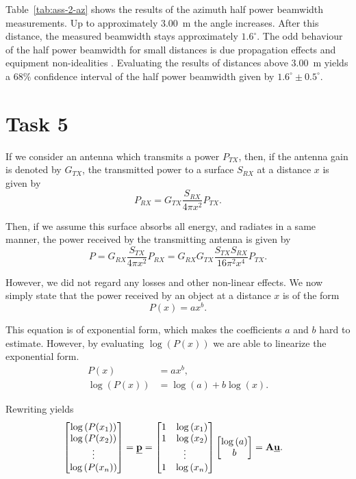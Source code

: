 \documentclass[11pt,titlepage]{report}
\begin{document}
Table~\ref{tab:ass-2-az} shows the results of the azimuth half power beamwidth measurements. Up to approximately \SI{3.00}{m} the angle increases. After this distance, the measured beamwidth stays approximately $1.6^\circ$. The odd behaviour of the half power beamwidth for small distances is due propagation effects and equipment non-idealities \cite{epo4-manual}. Evaluating the results of distances above \SI{3.00}{m} yields a $68\%$ confidence interval of the half power beamwidth given by $1.6^{\circ} \pm 0.5^{\circ}$.

\section{Task 5}
If we consider an antenna which transmits a power $P_{TX}$, then, if the antenna gain is denoted by $G_{TX}$, the transmitted power to a surface $S_{RX}$ at a distance $x$ is given by	
\begin{equation}
 	P_{RX} = G_{TX} \frac{S_{RX}}{4 \pi x^2}P_{TX}.
\end{equation}

Then, if we assume this surface absorbs all energy, and radiates in a same manner, the power received by the transmitting antenna is given by
\begin{equation}
	P = G_{RX} \frac{S_{TX}}{4 \pi x^2}P_{RX} = G_{RX} G_{TX} \frac{S_{TX} S_{RX}}{16 \pi^2 x^4} P_{TX}.
\end{equation}

However, we did not regard any losses and other non-linear effects. We now simply state that the power received by an object at a distance $x$ is of the form
\begin{equation}
	P(x) = a x^b.
\end{equation}

This equation is of exponential form, which makes the coefficients $a$ and $b$ hard to estimate. However, by evaluating $\log{(P(x))}$ we are able to linearize the exponential form.
\begin{align}
	P(x)&=a x^b, \\
	\log{(P(x))} &= \log{(a)} + b \log{(x)}.
\end{align}

Rewriting yields
\begin{align}
	\begin{bmatrix}
		\log{(P(x_1))} \\
		\log{(P(x_2))} \\
		\vdots \\
		\log{(P(x_n))}
	\end{bmatrix} &= \vec{p} = \begin{bmatrix}
		1 & \log{(x_1)} \\
		1 & \log{(x_2)} \\
		\multicolumn{2}{c}{\vdots} \\
		1 & \log{(x_n)}
	\end{bmatrix} \begin{bmatrix}
		\log{(a)} \\
		b
	\end{bmatrix} = \mat{A} \vec{u}.
\end{align}
\end{document}
